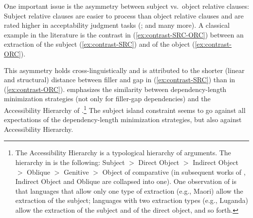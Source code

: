 One important issue is the asymmetry between subject vs.\ object relative clauses: Subject relative clauses are easier to process than object relative clauses and are rated higher in acceptability judgment tasks (\citealt{Holmes.1981}; \citealt{Wanner.1978} and many more). A classical example in the literature is the contrast in (\ref{ex:contrast-SRC-ORC}) between an extraction of the subject (\ref{ex:contrast-SRC}) and of the object (\ref{ex:contrast-ORC}). 

\begin{exe}
\ex \citep[20--21]{Gibson.1998}
\label{ex:contrast-SRC-ORC}
\begin{xlist}
\end{xlist}
\end{exe}

This asymmetry holds cross-linguistically and is attributed to the shorter (linear and structural) distance between filler and gap in (\ref{ex:contrast-SRC}) than in (\ref{ex:contrast-ORC}). \citet[252--256]{Hawkins.1999} emphasizes the similarity between dependency-length minimization strategies (not only for filler-gap dependencies) and the Accessibility Hierarchy of \citet{Keenan.1977}.\footnote{The Accessibility Hierarchy is a typological hierarchy of arguments. The hierarchy in \citet{Keenan.1977} is the following: Subject $>$ Direct Object $>$ Indirect Object $>$ Oblique $>$ Genitive $>$ Object of comparative (in subsequent works of \citeauthor{Keenan.1977}, Indirect Object and Oblique are collapsed into one). One observation of \citet{Keenan.1977} is that languages that allow only one type of extraction (e.g., Maori) allow the extraction of the subject; languages with two extraction types (e.g., Luganda) allow the extraction of the subject and of the direct object, and so forth.} The subject island constraint seems to go against all expectations of the dependency-length minimization strategies, but also against  Accessibility Hierarchy. 

